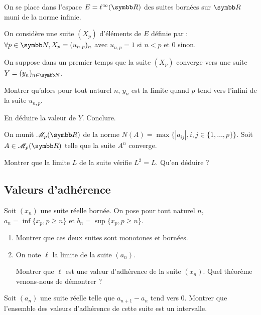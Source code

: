 \begin{exercice}
    On se place dans l'espace $E=\ell^{\infty}(\R)$ des suites bornées sur $\R$ muni de la norme infinie.

    On considère une suite $(X_{p})$ d'éléments de $E$ définie par : 
    $\forall p\in\N, X_{p}=(u_{n,p})_{n}$ avec $u_{n,p}=1$ si $n<p$ et $0$ sinon.

    On suppose dans un premier temps que la suite $(X_{p})$ converge vers une suite $Y=(y_{n})_{n\in\N}$.

    Montrer qu'alors pour tout naturel $n$, $y_{n}$ est la limite quand $p$ tend vers l'infini de la suite $u_{n,p}$.
    
    En déduire la valeur de $Y$. Conclure.
\end{exercice}

\begin{exercice}
    On munit $\mathscr M_{p}(\R)$ de la norme $N(A) = \max\{|a_{ij}|, i,j\in\{1,\dots,p\}\}$.
    Soit $A\in \mathscr M_{p}(\R)$ telle que la suite $A^{n}$ converge.

    Montrer que la limite $L$ de la suite vérifie $L^{2}=L$. Qu'en déduire ?
\end{exercice}

\subsection{Valeurs d'adhérence}
\begin{exercice}
    Soit $(x_{n})$ une suite réelle bornée. On pose pour tout naturel $n$,
    $a_{n}=\inf\{x_{p},p\geqslant n\}$ et $b_{n}=\sup\{x_{p},p\geqslant n\}$.
    \begin{enumerate}
        \item Montrer que ces deux suites sont monotones et bornées.
        \item On note $\ell$ la limite de la suite $(a_{n})$.
        
            Montrer que $\ell$ est une valeur d'adhérence de la suite $(x_{n})$.
            Quel théorème venons-nous de démontrer ?
    \end{enumerate}
\end{exercice}

\begin{exercice}
    Soit $(a_{n})$ une suite réelle telle que $a_{n+1}-a_{n}$ tend vers 0.
    Montrer que l'ensemble des valeurs d'adhérence de cette suite est un intervalle.
\end{exercice}

